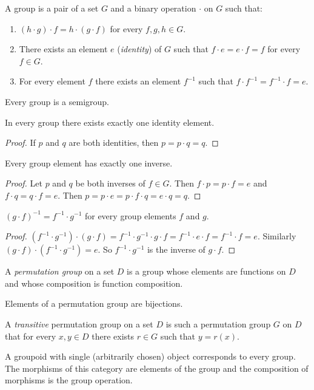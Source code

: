 \begin{defn}
A group is a pair of a set $G$ and a binary operation
$\cdot$ on $G$ such that:
\begin{enumerate}
\item $(h\cdot g)\cdot f=h\cdot(g\cdot f)$ for every $f,g,h\in G$.
\item {}There exists an element $e$ (\emph{identity}) of
$G$ such that $f\cdot e=e\cdot f=f$ for every $f\in G$.
\item For every element $f$ there exists an element $f^{-1}$ such that
$f\cdot f^{-1}=f^{-1}\cdot f=e$.
\end{enumerate}
\end{defn}
\begin{obvious}
Every group is a semigroup.\end{obvious}
\begin{prop}
In every group there exists exactly one identity element.\end{prop}
\begin{proof}
If $p$ and $q$ are both identities, then $p=p\cdot q=q$.\end{proof}
\begin{prop}
Every group element has exactly one inverse.\end{prop}
\begin{proof}
Let $p$ and $q$ be both inverses of $f\in G$. Then $f\cdot p=p\cdot f=e$
and $f\cdot q=q\cdot f=e$. Then $p=p\cdot e=p\cdot f\cdot q=e\cdot q=q$.\end{proof}
\begin{prop}
$(g\cdot f)^{-1}=f^{-1}\cdot g^{-1}$ for every group elements $f$
and $g$.\end{prop}
\begin{proof}
$(f^{-1}\cdot g^{-1})\cdot(g\cdot f)=f^{-1}\cdot g^{-1}\cdot g\cdot f=f^{-1}\cdot e\cdot f=f^{-1}\cdot f=e$.
Similarly $(g\cdot f)\cdot(f^{-1}\cdot g^{-1})=e$. So $f^{-1}\cdot g^{-1}$
is the inverse of $g\cdot f$.\end{proof}
\begin{defn}
A \emph{permutation group} on a set $D$
is a group whose elements are functions on $D$ and whose composition
is function composition.\end{defn}
\begin{obvious}
Elements of a permutation group are bijections.\end{obvious}
\begin{defn}
A \emph{transitive} permutation
group on a set $D$ is such a permutation group $G$ on $D$ that
for every $x,y\in D$ there exists $r\in G$ such that $y=r(x)$.
\end{defn}
A groupoid with single (arbitrarily chosen) object corresponds to
every group. The morphisms of this category are elements of the group
and the composition of morphisms is the group operation.
